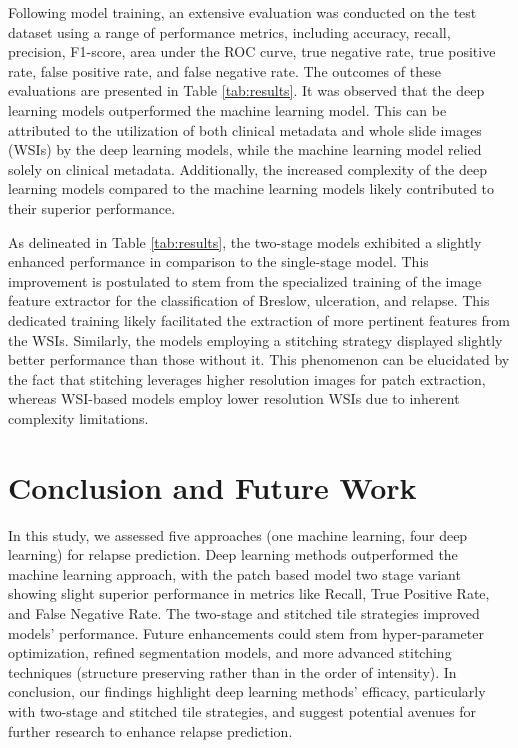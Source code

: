 \documentclass[conference]{IEEEtran}
\begin{document}
Following model training, an extensive evaluation was conducted on the test dataset using a range of performance metrics, including accuracy, recall, precision, F1-score, area under the ROC curve, true negative rate, true positive rate, false positive rate, and false negative rate. The outcomes of these evaluations are presented in Table \ref{tab:results}. It was observed that the deep learning models outperformed the machine learning model. This can be attributed to the utilization of both clinical metadata and whole slide images (WSIs) by the deep learning models, while the machine learning model relied solely on clinical metadata. Additionally, the increased complexity of the deep learning models compared to the machine learning models likely contributed to their superior performance.

As delineated in Table \ref{tab:results}, the two-stage models exhibited a slightly enhanced performance in comparison to the single-stage model. This improvement is postulated to stem from the specialized training of the image feature extractor for the classification of Breslow, ulceration, and relapse. This dedicated training likely facilitated the extraction of more pertinent features from the WSIs. Similarly, the models employing a stitching strategy displayed slightly better performance than those without it. This phenomenon can be elucidated by the fact that stitching leverages higher resolution images for patch extraction, whereas WSI-based models employ lower resolution WSIs due to inherent complexity limitations.

\section{Conclusion and Future Work}

In this study, we assessed five approaches (one machine learning, four deep learning) for relapse prediction. Deep learning methods outperformed the machine learning approach, with the patch based model two stage variant  showing slight superior performance in metrics like Recall, True Positive Rate, and False Negative Rate. The two-stage and stitched tile strategies improved models' performance. Future enhancements could stem from hyper-parameter optimization, refined segmentation models, and more advanced stitching techniques (structure preserving rather than in the order of intensity). In conclusion, our findings highlight deep learning methods' efficacy, particularly with two-stage and stitched tile strategies, and suggest potential avenues for further research to enhance relapse prediction.
\end{document}
